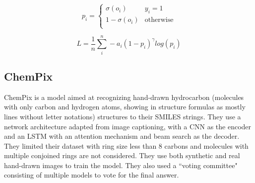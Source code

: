\documentclass[12pt]{article}
\begin{document}
\begin{equation}
    p_i = \begin{cases} \sigma(o_i) &  y_i=1 \\
    1-\sigma(o_i) & \text{otherwise} \\
    \end{cases}
    \label{focal}
\end{equation}

\begin{equation}
    L = \frac{1}{n}\sum_i^n -a_i(1-p_i)^\gamma log(p_i)
\end{equation}




\subsection{ChemPix}
ChemPix \cite{chempix} is a model aimed at recognizing hand-drawn hydrocarbon (molecules with only carbon and hydrogen atoms, showing in structure formulas as mostly lines without letter notations) structures to their SMILES strings. They use a network architecture adapted from image captioning, with a CNN as the encoder and an LSTM with an attention mechanism and beam search as the decoder. \cite{chempix} They limited their dataset with ring size less than 8 carbons and molecules with multiple conjoined rings are not considered. They use both synthetic and real hand-drawn images to train the model. They also used a ``voting committee" consisting of multiple models to vote for the final answer.
\end{document}
